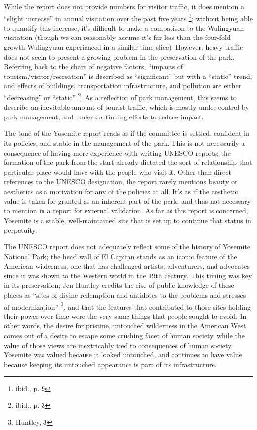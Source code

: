 While the report does not provide numbers for visitor traffic, it does mention
a ``slight increase'' in annual visitation over the past five years
\footnote{ibid., p. 9}; without being able to quantify this increase, it's
difficult to make a comparison to the Wulingyuan visitation (though we can
reasonably assume it's far less than the four-fold growth Wulingyuan
experienced in a similar time slice). However, heavy
traffic does not seem to present a growing problem in the preservation of the
park. Referring back to the chart of negative factors, ``impacts of
tourism/visitor/recreation'' is described as ``significant'' but with a
``static'' trend, and effects of buildings, transportation infrastructure, and
pollution are either ``decreasing'' or ``static'' \footnote{ibid., p. 3}. As a
reflection of park management, this seems to describe an inevitable amount of
tourist traffic, which is mostly under control by park management, and under
continuing efforts to reduce impact.

The tone of the Yosemite report reads as if the committee is settled, confident
in its policies, and stable in the management of the park. This is not
necessarily a consequence of having more experience with writing UNESCO
reports; the formation of the park from the start already dictated the sort
of relationship that particular place would have with the people who visit it.
Other than direct references to the UNESCO designation, the report rarely
mentions beauty or aesthetics as a motivation for any of the policies at all. It's
as if the aesthetic value is taken for granted as an inherent part of the park,
and thus not necessary to mention in a report for external validation. As far
as this report is concerned, Yosemite is a stable, well-maintained site that is
set up to continue that status in perpetuity.

The UNESCO report does not adequately reflect some of the history of Yosemite
National Park; the head wall of El Capitan stands as an iconic feature of the
American wilderness, one that has challenged artists, adventurers, and
advocates since it was shown to the Western world in the 19th century. This
timing was key in its preservation; Jen Huntley credits the rise of public
knowledge of these places as ``sites of divine redemption and antidotes to the
problems and stresses of modernization'' \footnote{Huntley, 3}, and that the
features that contributed to those sites holding their power over time were the
very same things that people sought to avoid. In other words, the desire for
pristine, untouched wilderness in the American West comes out of a desire to
escape some crushing facet of human society, while the value of those views are
inextricably tied to consequences of human society. Yosemite was valued because
it looked untouched, and continues to have value because keeping its untouched
appearance is part of its infrastructure.

